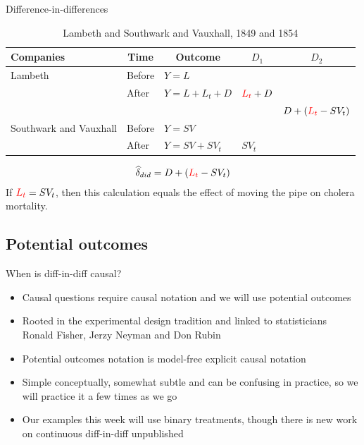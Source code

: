 \documentclass{beamer}
\begin{document}
\begin{frame}{Difference-in-differences}

\begin{table}\centering
\scriptsize
		\caption{Lambeth and Southwark and Vauxhall, 1849 and 1854}
		\begin{center}
		\begin{tabular}{lll|lc}
		\toprule
		\multicolumn{1}{l}{\textbf{Companies}}&
		\multicolumn{1}{c}{\textbf{Time}}&
		\multicolumn{1}{c}{\textbf{Outcome}}&
		\multicolumn{1}{c}{$D_1$}&
		\multicolumn{1}{c}{$D_2$}\\
		\midrule
		Lambeth & Before & $Y=L$ \\
		& After & $Y=L + L_t + D$ & $\textcolor{red}{L_t}+D$\\
		\midrule
		& & & & $D + (\textcolor{red}{L_t}- SV_t)$ \\
		\midrule
		Southwark and Vauxhall & Before & $Y=SV$ \\
		& After & $Y=SV + SV_t$ & $SV_t$\\
		\bottomrule
		\end{tabular}
		\end{center}
	\end{table}

\begin{eqnarray*}
\widehat{\delta}_{did} = D + (\textcolor{red}{L_t}- SV_t)
\end{eqnarray*}If $\textcolor{red}{L_t}=SV_t$, then this calculation equals the effect of moving the pipe on cholera mortality.

\end{frame}







\subsection{Potential outcomes}



\begin{frame}{When is diff-in-diff causal?}

\begin{itemize}
\item Causal questions require causal notation and we will use potential outcomes
\item Rooted in the experimental design tradition and linked to statisticians Ronald Fisher, Jerzy Neyman and Don Rubin
\item Potential outcomes notation is model-free explicit causal notation
\item Simple conceptually, somewhat subtle and can be confusing in practice, so we will practice it a few times as we go
\item Our examples this week will use binary treatments, though there is new work on continuous diff-in-diff unpublished
\end{itemize}

\end{frame}
\end{document}
